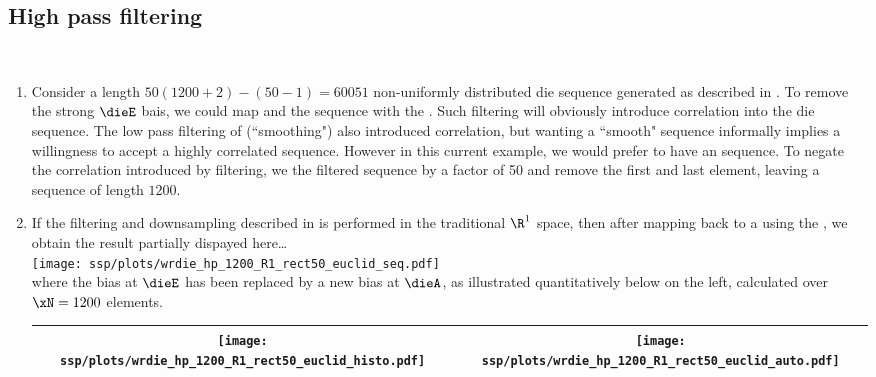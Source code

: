 \subsection{High pass filtering}
\label{sec:hp}
\begin{example}
\label{ex:wrdie_hp}
\mbox{}\\
\begin{enumerate}
  \item \label{item:wrdie_hp_R1_rect50}
        Consider a length $50(1200+2)-(50-1)=60051$ non-uniformly distributed die sequence generated as
        described in .
        To remove the strong $\dieE$ bais, we could map and   the sequence with the 
         .
        Such filtering will obviously introduce correlation into the die sequence. 
        The low pass filtering of  (``smoothing") also introduced correlation,
        but wanting a ``smooth" sequence informally implies a willingness to accept a highly correlated sequence.
        However in this current example, we would prefer to have an  sequence.
        To negate the correlation introduced by filtering, 
        we   the filtered sequence by a factor of 50 and
        remove the first and last element, leaving a sequence of length $1200$.

  \item \label{item:wrdie_hp_R1_rect50_euclid}
        If the filtering and downsampling described in  
        is performed in the traditional $\R^1$ space,
        then after mapping back to a  using the ,
        we obtain the result partially dispayed here\ldots
          \\\texttt{[image: ssp/plots/wrdie\_hp\_1200\_R1\_rect50\_euclid\_seq.pdf]}\\
        where the bias at $\dieE$ has been replaced by a new bias at $\dieA$, 
        as illustrated quantitatively below on the left, 
        calculated over $\xN=1200$ elements. 
          \\\begin{tabular}{|>{\scs}c|>{\scs}c|}
               \hline
               \texttt{[image: ssp/plots/wrdie\_hp\_1200\_R1\_rect50\_euclid\_histo.pdf]}
              &\texttt{[image: ssp/plots/wrdie\_hp\_1200\_R1\_rect50\_euclid\_auto.pdf]}
             \\\hline
          \end{tabular}


\end{enumerate}
\end{example}
